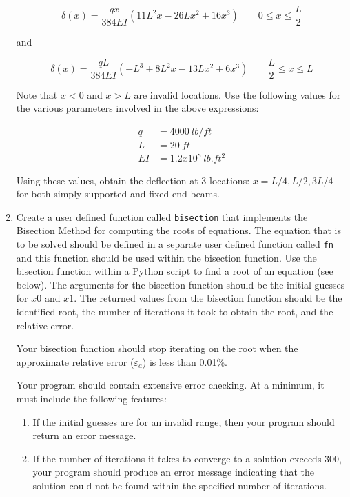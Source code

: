 \documentclass[a4paper,12pt]{article}
\begin{document}
\begin{enumerate}
	\begin{equation*}
	\delta(x) = \frac{q x}{384EI}(11L^2x - 26Lx^2 + 16x^3) \qquad 0 \le x \le \frac{L}{2}
	\end{equation*}
	
	and 
	
	\begin{equation*}
	\delta(x) = \frac{q L}{384EI}( -L^3  + 8L^2x - 13Lx^2 + 6x^3) \qquad \frac{L}{2} \le x \le L
	\end{equation*}
	
	Note that $x < 0$ and $x > L$ are invalid locations. Use the following values for the various parameters involved in the above expressions:
	
	\begin{align*}
		q & = 4000 ~lb/ft\\
		L & = 20 ~ft\\
		EI & = 1.2x10^8 ~lb.ft^2
	\end{align*}
	
	Using these values, obtain the deflection at 3 locations: $x = L/4, L/2, 3L/4$ for both simply supported and fixed end beams.
	
	\item Create a user defined function called \verb|bisection| that implements the Bisection Method for computing the roots of equations. The equation that is to be solved should be defined in a separate user defined function called \verb|fn| and this function should be used within the bisection function. Use the bisection function within a Python script to find a root of an equation (see below).
	The arguments for the bisection function should be the initial guesses for $x0$ and $x1$.  The returned values from the bisection function should be the identified root, the number of iterations it took to obtain the root, and the relative error. 
	
	Your bisection function should stop iterating on the root when the approximate relative error ($\varepsilon_a$) is less than 0.01\%.

	Your program should contain extensive error checking. At a minimum, it must include the following features:
	\begin{enumerate}
		\item If the initial guesses are for an invalid range, then your program should return an error message.
		\item If the number of iterations it takes to converge to a solution exceeds 300, your program should produce an error message indicating that the solution could not be found within the specified number of iterations.
	\end{enumerate}


\end{enumerate}
\end{document}
